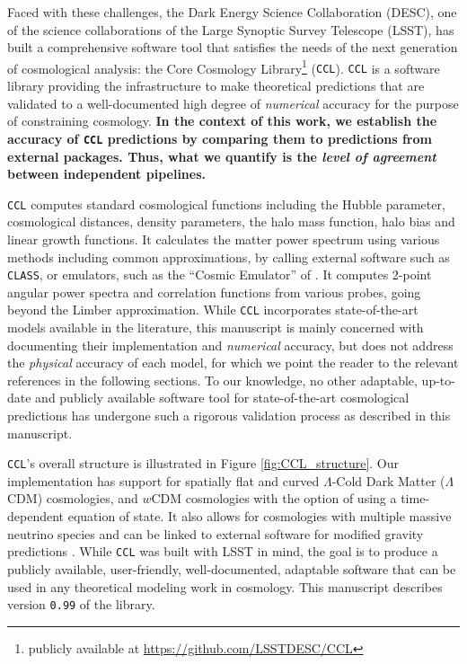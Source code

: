\documentclass[\docopts]{\docclass}
\newcommand{\ccl}{{\tt CCL}\xspace}
\newcommand{\class}{{\tt CLASS}\xspace}
\newcommand{\hiclass}{{\tt hi$\_$CLASS\xspace}}
\begin{document}
Faced with these challenges, the Dark Energy Science Collaboration (DESC), one of the science collaborations of the Large Synoptic Survey Telescope (LSST), has built a comprehensive software tool that satisfies the needs of the next generation of cosmological analysis: the Core Cosmology Library\footnote{publicly available at \url{https://github.com/LSSTDESC/CCL}} (\ccl). \ccl is a software library providing the infrastructure to make theoretical predictions that are validated to a well-documented high degree of {\it numerical} accuracy for the purpose of constraining cosmology. {\bf In the context of this work, we establish the accuracy of \ccl predictions by comparing them to predictions from external packages. Thus, what we quantify is the {\it level of agreement} between independent pipelines.}

\ccl computes standard cosmological functions including the Hubble parameter, cosmological distances, density parameters, the halo mass function, halo bias and linear growth functions. It calculates the matter power spectrum using various methods including common approximations, by calling external software such as \class \citep{class}, or emulators, such as the ``Cosmic Emulator'' of \citet{Lawrence17}. It computes 2-point angular power spectra and correlation functions from various probes, going beyond the Limber approximation. While \ccl incorporates state-of-the-art models available in the literature, this manuscript is mainly concerned with documenting their implementation and {\it numerical} accuracy, but does not address the {\it physical} accuracy of each model, for which we point the reader to the relevant references in the following sections. To our knowledge, no other adaptable, up-to-date and publicly available software tool for state-of-the-art cosmological predictions has undergone such a rigorous validation process as described in this manuscript.  

\ccl 's overall structure is illustrated in Figure \ref{fig:CCL_structure}. Our implementation has support for spatially flat and curved $\Lambda$-Cold Dark Matter ($\Lambda$CDM) cosmologies, and $w$CDM cosmologies with the option of using a time-dependent equation of state. It also allows for cosmologies with multiple massive neutrino species and can be linked to external software for modified gravity predictions \citep[\hiclass,][]{Zumalacarregui17}. While \ccl was built with LSST in mind, the goal is to produce a publicly available, user-friendly, well-documented, adaptable software that can be used in any theoretical modeling work in cosmology. This manuscript describes version {\tt 0.99} of the library.
\end{document}
